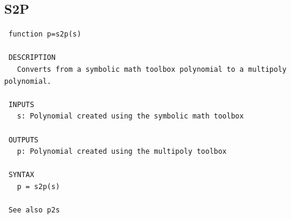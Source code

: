 \documentclass{article}
\begin{document}
\subsection{S2P}
\begin{verbatim}
 function p=s2p(s)

 DESCRIPTION
   Converts from a symbolic math toolbox polynomial to a multipoly polynomial.

 INPUTS
   s: Polynomial created using the symbolic math toolbox

 OUTPUTS
   p: Polynomial created using the multipoly toolbox

 SYNTAX
   p = s2p(s)

 See also p2s
\end{verbatim}
\end{document}
